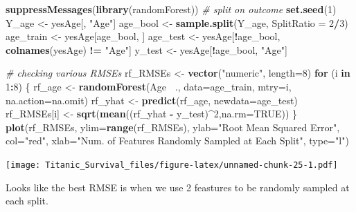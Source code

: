 \documentclass[]{article}
\newenvironment{Shaded}{\begin{snugshade}}{\end{snugshade}}
\newcommand{\KeywordTok}[1]{\textcolor[rgb]{0.13,0.29,0.53}{\textbf{#1}}}
\newcommand{\DataTypeTok}[1]{\textcolor[rgb]{0.13,0.29,0.53}{#1}}
\newcommand{\DecValTok}[1]{\textcolor[rgb]{0.00,0.00,0.81}{#1}}
\newcommand{\StringTok}[1]{\textcolor[rgb]{0.31,0.60,0.02}{#1}}
\newcommand{\CommentTok}[1]{\textcolor[rgb]{0.56,0.35,0.01}{\textit{#1}}}
\newcommand{\OtherTok}[1]{\textcolor[rgb]{0.56,0.35,0.01}{#1}}
\newcommand{\ControlFlowTok}[1]{\textcolor[rgb]{0.13,0.29,0.53}{\textbf{#1}}}
\newcommand{\OperatorTok}[1]{\textcolor[rgb]{0.81,0.36,0.00}{\textbf{#1}}}
\newcommand{\NormalTok}[1]{#1}
\begin{document}
\begin{Shaded}
\begin{Highlighting}[]
\KeywordTok{suppressMessages}\NormalTok{(}\KeywordTok{library}\NormalTok{(randomForest))}
\CommentTok{# split on outcome}
\KeywordTok{set.seed}\NormalTok{(}\DecValTok{1}\NormalTok{)}
\NormalTok{Y_age <-}\StringTok{ }\NormalTok{yesAge[, }\StringTok{"Age"}\NormalTok{]}
\NormalTok{age_bool <-}\StringTok{ }\KeywordTok{sample.split}\NormalTok{(Y_age, }\DataTypeTok{SplitRatio =} \DecValTok{2}\OperatorTok{/}\DecValTok{3}\NormalTok{) }
\NormalTok{age_train <-}\StringTok{ }\NormalTok{yesAge[age_bool, ]}
\NormalTok{age_test <-}\StringTok{ }\NormalTok{yesAge[}\OperatorTok{!}\NormalTok{age_bool, }\KeywordTok{colnames}\NormalTok{(yesAge) }\OperatorTok{!=}\StringTok{ "Age"}\NormalTok{]}
\NormalTok{y_test <-}\StringTok{ }\NormalTok{yesAge[}\OperatorTok{!}\NormalTok{age_bool, }\StringTok{"Age"}\NormalTok{]}

\CommentTok{# checking various RMSEs}
\NormalTok{rf_RMSEs <-}\StringTok{ }\KeywordTok{vector}\NormalTok{(}\StringTok{"numeric"}\NormalTok{, }\DataTypeTok{length=}\DecValTok{8}\NormalTok{)}
\ControlFlowTok{for}\NormalTok{ (i }\ControlFlowTok{in} \DecValTok{1}\OperatorTok{:}\DecValTok{8}\NormalTok{) \{}
\NormalTok{  rf_age <-}\StringTok{ }\KeywordTok{randomForest}\NormalTok{(Age }\OperatorTok{~}\NormalTok{., }\DataTypeTok{data=}\NormalTok{age_train, }\DataTypeTok{mtry=}\NormalTok{i, }\DataTypeTok{na.action=}\NormalTok{na.omit)}
\NormalTok{  rf_yhat <-}\StringTok{ }\KeywordTok{predict}\NormalTok{(rf_age, }\DataTypeTok{newdata=}\NormalTok{age_test)}
\NormalTok{  rf_RMSEs[i] <-}\StringTok{ }\KeywordTok{sqrt}\NormalTok{(}\KeywordTok{mean}\NormalTok{((rf_yhat }\OperatorTok{-}\StringTok{ }\NormalTok{y_test)}\OperatorTok{^}\DecValTok{2}\NormalTok{,}\DataTypeTok{na.rm=}\OtherTok{TRUE}\NormalTok{))}
\NormalTok{\}}
\KeywordTok{plot}\NormalTok{(rf_RMSEs, }\DataTypeTok{ylim=}\KeywordTok{range}\NormalTok{(rf_RMSEs), }\DataTypeTok{ylab=}\StringTok{"Root Mean Squared Error"}\NormalTok{, }\DataTypeTok{col=}\StringTok{"red"}\NormalTok{,}
     \DataTypeTok{xlab=}\StringTok{"Num. of Features Randomly Sampled at Each Split"}\NormalTok{, }\DataTypeTok{type=}\StringTok{"l"}\NormalTok{)}
\end{Highlighting}
\end{Shaded}

\texttt{[image: Titanic\_Survival\_files/figure-latex/unnamed-chunk-25-1.pdf]}

Looks like the best RMSE is when we use 2 feastures to be randomly
sampled at each split.
\end{document}
